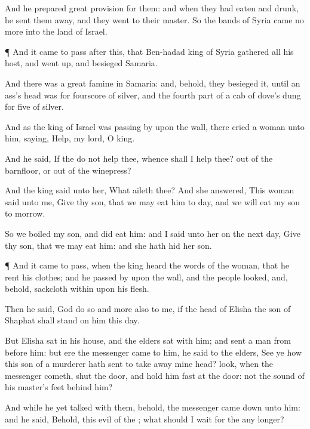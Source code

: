 {And he
prepared
great
provision for them: and when they had
eaten and
drunk, he sent them
away, and they
went to their
master. So the
bands of
Syria
came no
more into the
land of
Israel.


\par }{\PP {}¶ And it came to pass after
this, that
Ben-hadad
king of
Syria
gathered all his
host, and went
up, and
besieged
Samaria.

And there was a
great
famine in
Samaria: and, behold, they
besieged it, until an
ass’s
head was
{} for
fourscore
{} of
silver, and the fourth
part of a
cab of
dove’s dung for
five
{} of
silver.

And as the
king of
Israel was passing
by upon the
wall, there
cried a
woman unto him,
saying,
Help, my
lord, O
king.

And he
said, If the
{} do not
help thee,
whence shall I
help thee? out of the
barnfloor, or out of the
winepress?

And the
king
said unto her, What aileth thee? And she
answered, This
woman
said unto me,
Give thy
son, that we may
eat him to
day, and we will
eat my
son to
morrow.

So we
boiled my
son, and did
eat him: and I
said unto her on the
next
day,
Give thy
son, that we may
eat him: and she hath
hid her
son.


\par }{\PP {}¶ And it came to pass, when the
king
heard the
words of the
woman, that he
rent his
clothes; and he passed
by upon the
wall, and the
people
looked, and, behold,
{}
sackcloth
within upon his
flesh.

Then he
said,
God
do so and
more also to me, if the
head of
Elisha the
son of
Shaphat shall
stand on him this
day.

But
Elisha
sat in his
house, and the
elders
sat with him; and
{}
sent a
man from
before him: but ere the
messenger
came to him, he
said to the
elders,
See ye how this
son of a
murderer hath
sent to take
away mine
head?
look, when the
messenger
cometh,
shut the
door, and hold him
fast at the
door:
{} not the
sound of his
master’s
feet
behind him?

And while he yet
talked with them, behold, the
messenger came
down unto him: and he
said, Behold, this
evil
{} of the
{}; what should I
wait for the
{} any longer?




}
